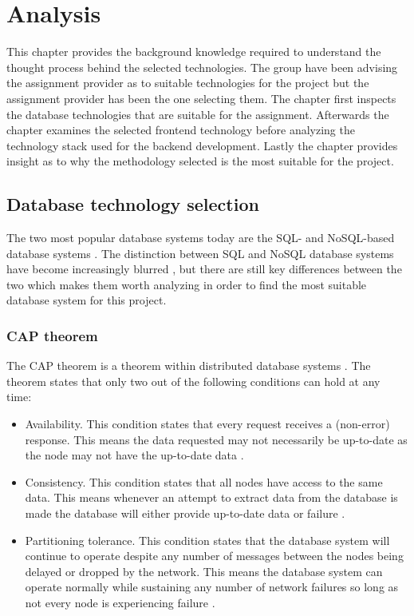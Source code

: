 \chapter{Analysis}
This chapter provides the background knowledge required to understand the thought process behind the selected technologies.
The group have been advising the assignment provider as to suitable technologies for the project but the assignment provider has been the one selecting them.
The chapter first inspects the database technologies that are suitable for the assignment.
Afterwards the chapter examines the selected frontend technology before analyzing the technology stack used for the backend development.
Lastly the chapter provides insight as to why the methodology selected is the most suitable for the project.

\section{Database technology selection}
The two most popular database systems today are the SQL- and NoSQL-based database systems \cite{stackoverflow-db-statistics}.
The distinction between SQL and NoSQL database systems have become increasingly blurred \cite{sql-vs-nosql}, but there are still key differences between the two which makes them worth analyzing in order to find the most suitable database system for this project.

\iffalse
\subsection{CAP theorem}
The CAP theorem is a theorem within distributed database systems \cite{sql-schema}.
The theorem states that only two out of the following conditions can hold at any time:
\begin{itemize}
    \item Availability.
    This condition states that every request receives a (non-error) response.
    This means the data requested may not necessarily be up-to-date as the node may not have the up-to-date data \cite{sql-schema}.
    \item Consistency.
    This condition states that all nodes have access to the same data.
    This means whenever an attempt to extract data from the database is made the database will either provide up-to-date data or failure \cite{sql-schema}.
    \item Partitioning tolerance.
    This condition states that the database system will continue to operate despite any number of messages between the nodes being delayed or dropped by the network.
    This means the database system can operate normally while sustaining any number of network failures so long as not every node is experiencing failure \cite{sql-schema}.
\end{itemize}

